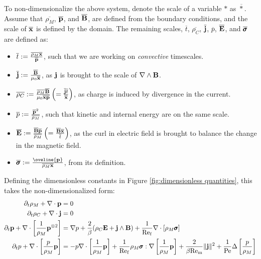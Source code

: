     To non-dimensionalize the above system, denote the scale of a variable $*$ as $\overline{*}$. Assume that $\overline{\rho_{M}}$, $\overline{\mathbf{p}}$, and $\overline{\mathbf{B}}$, are defined from the boundary conditions, and the scale of $\overline{\mathbf{x}}$ is defined by the domain. The remaining scales, $\overline{t}$, $\overline{\rho_{C}}$, $\overline{\mathbf{j}}$, $\overline{p}$, $\overline{\mathbf{E}}$, and $\overline{\pmb{\mathsf{\sigma}}}$ are defined as:  
    \begin{itemize}
        \item  $\overline{t}  :=  \frac{\overline{\rho_{M}}\overline{\mathbf{x}}}{\overline{\mathbf{p}}}$, such that we are working on \emph{convective} timescales.
        \item  $\overline{\mathbf{j}}  :=  \frac{\overline{\mathbf{B}}}{\mu_{0}\overline{\mathbf{x}}}$, as $\mathbf{j}$ is brought to the scale of $\nabla\wedge\mathbf{B}$.
        \item  $\overline{\rho_{C}}  :=  \frac{\overline{\rho_{M}}\overline{\mathbf{B}}}{\mu_{0}\overline{\mathbf{x}}\overline{\mathbf{p}}}  \left(=  \frac{\overline{\mathbf{j}}\overline{t}}{\overline{\mathbf{x}}}\right)$, as charge is induced by divergence in the current.
        \item  $\overline{p}  :=  \frac{\overline{\mathbf{p}}^{2}}{\overline{\rho_{M}}}$, such that kinetic and internal energy are on the same scale.
        \item  $\overline{\mathbf{E}}  :=  \frac{\overline{\mathbf{B}}\overline{\mathbf{p}}}{\overline{\rho_{M}}}  \left(=  \frac{\overline{\mathbf{B}}\overline{\mathbf{x}}}{\overline{t}}\right)$, as the curl in electric field is brought to balance the change in the magnetic field.
        \item  $\overline{\bfsigma}  :=  \frac{\oveline{\bfp}}{\overline{\rho_{M}}\overline{\bfx}}$, from its definition.
    \end{itemize}
    Defining the dimensionless constants in Figure \ref{fig:dimensionless quantities}, this takes the non-dimensionalized form:
    {\small \begin{align}
        \partial_{t}\rho_{M} + \nabla\cdot\mathbf{p}  &=  0  \\
        \partial_{t}\rho_{C} + \nabla\cdot\mathbf{j}  &=  0  \\
        \partial_{t}\mathbf{p} + \nabla\cdot\left[\frac{1}{\rho_{M}}\mathbf{p}^{\otimes 2}\right]  &=  \nabla p + \frac{2}{\beta}(\rho_{C}\mathbf{E} + \mathbf{j}\wedge\mathbf{B}) + \frac{1}{\mathrm{Re}_{\mathrm{f}}}\nabla\cdot[\rho_{M}\pmb{\mathsf{\sigma}}]  \\
        \partial_{t}p + \nabla\cdot\left[\frac{p}{\rho_{M}}\mathbf{p}\right]  &=  - p\nabla\cdot\left[\frac{1}{\rho_{M}}\mathbf{p}\right] + \frac{1}{\mathrm{Re}_{\mathrm{f}}}\rho_{M}\pmb{\mathsf{\sigma}}:\nabla\left[\frac{1}{\rho_{M}}\mathbf{p}\right] + \frac{2}{\beta\mathrm{Re}_{\mathrm{m}}}\|\mathbf{j}\|^{2} + \frac{1}{\mathrm{Pe}}\Delta\left[\frac{p}{\rho_{M}}\right]
    \end{align}}
